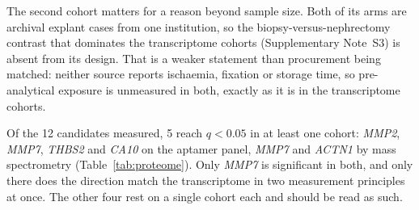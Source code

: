 \documentclass[11pt]{article}
\begin{document}
The second cohort matters for a reason beyond sample size. Both of its arms are archival explant
cases from one institution, so the biopsy-versus-nephrectomy contrast that dominates the
transcriptome cohorts (Supplementary Note~S3) is absent from its design. That is a
weaker statement than procurement being matched: neither source reports ischaemia, fixation or
storage time, so pre-analytical exposure is unmeasured in both, exactly as it is in the
transcriptome cohorts.

Of the 12 candidates measured, 5 reach $q < 0.05$ in at least one cohort: \textit{MMP2},
\textit{MMP7}, \textit{THBS2} and \textit{CA10} on the aptamer panel, \textit{MMP7} and \textit{ACTN1} by
mass spectrometry (Table~\ref{tab:proteome}). Only \textit{MMP7} is significant in both, and only
there does the direction match the transcriptome in two measurement principles at once. The
other four rest on a single cohort each and should be read as such.
\end{document}
